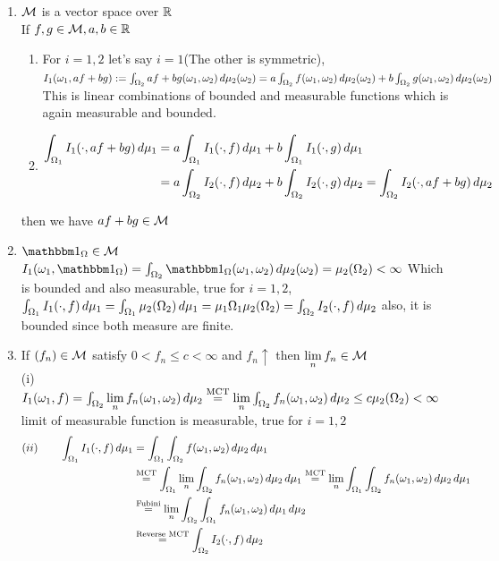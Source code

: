 \begin{enumerate} 
    \item $\mathcal{M}$ is a vector space over $\mathbb{R}$ \\
    If $f,g\in \mathcal{M}, a,b\in \mathbb{R}$ 
    \begin{enumerate}
        \item For $i=1,2$ let's say $i=1$(The other is symmetric), $I_1(\omega_1, af+bg) := \int_{\Omega_2} af+bg(\omega_1, \omega_2) \mathop{}\!d \mu_2 (\omega_2) = a\int_{\Omega_2} f(\omega_1, \omega_2) \mathop{}\!d \mu_2 (\omega_2)+b\int_{\Omega_2} g(\omega_1, \omega_2) \mathop{}\!d \mu_2 (\omega_2)$ This is linear combinations of bounded and measurable functions which is again measurable and bounded.
        \item \begin{align*}
            \int_{\Omega_1} I_1(\cdot, af+bg) \mathop{}\!d \mu_1 &= a\int_{\Omega_1} I_1(\cdot, f) \mathop{}\!d \mu_1 + b\int_{\Omega_1} I_1(\cdot, g) \mathop{}\!d \mu_1 \\
            &= a\int_{\Omega_2} I_2(\cdot, f) \mathop{}\!d \mu_2+b\int_{\Omega_2} I_2(\cdot, g) \mathop{}\!d \mu_2 = \int_{\Omega_2} I_2(\cdot, af+bg) \mathop{}\!d \mu_2
        \end{align*}
    \end{enumerate}then we have $af+bg \in \mathcal{M}$ 
    \item $\I_\Omega \in \M$ \\
    $I_1(\omega_1, \I_\Omega) = \int_{\Omega_2} \I_\Omega(\omega_1, \omega_2) \diff \mu_2 (\omega_2) = \mu_2 (\Omega_2) < \infty$ Which is bounded and also measurable, true for $i=1,2$, \\
    $\int_{\Omega_1} I_1(\cdot, f) \mathop{}\!d \mu_1 = \int_{\Omega_1} \mu_2(\Omega_2) \mathop{}\!d \mu_1 =\mu_1{\Omega_1} \mu_2(\Omega_2) =\int_{\Omega_2} I_2(\cdot, f) \mathop{}\!d \mu_2$ also, it is bounded since both measure are finite.
    \item If $(f_n)\in \mathcal{M}$ satisfy $0 < f_n \leq c < \infty$ and $f_n \uparrow$ then $\lim\limits_{n} f_n \in \mathcal{M}$ \\
     (i)$I_1(\omega_1, f) = \int_{\Omega_2} \lim\limits_{n}f_n(\omega_1, \omega_2) \mathop{}\!d \mu_2 \stackrel{\text{MCT}}{=}  \lim\limits_{n}\int_{\Omega_2} f_n(\omega_1, \omega_2) \mathop{}\!d \mu_2 \leq c \mu_2 (\Omega_2) < \infty$ limit of measurable function is measurable, true for $i=1,2$
\begin{align*}
    (ii) \qquad \int_{\Omega_1} I_1(\cdot, f) \diff \mu_1 &= \int_{\Omega_1}\int_{\Omega_2} f(\omega_1, \omega_2)\diff \mu_2 \diff \mu_1 \\
    &\stackrel{\text{MCT}}{=}\int_{\Omega_1}\biglim{n}\int_{\Omega_2} f_n(\omega_1, \omega_2)\diff \mu_2 \diff \mu_1 \stackrel{\text{MCT}}{=}\biglim{n}\int_{\Omega_1}\int_{\Omega_2} f_n(\omega_1, \omega_2)\diff \mu_2 \diff \mu_1 \\
    &\stackrel{\text{Fubini}}{=}\biglim{n}\int_{\Omega_2}\int_{\Omega_1} f_n(\omega_1, \omega_2)\diff \mu_1 \diff \mu_2 \\
    &\stackrel{\text{Reverse MCT}}{=} \int_{\Omega_2} I_2(\cdot, f)\diff \mu_2
\end{align*}
\end{enumerate}
